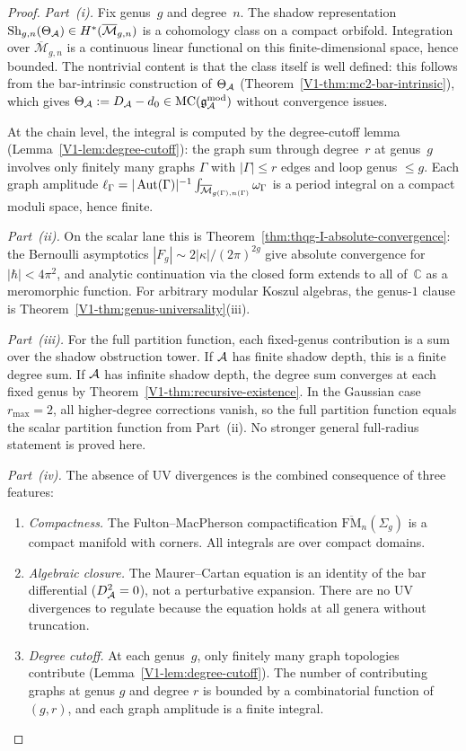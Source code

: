 \begin{proof}
\emph{Part~(i).} Fix genus~$g$ and degree~$n$. The shadow representation $\operatorname{Sh}_{g,n}(\Theta_{\mathcal{A}}) \in H^*(\overline{\mathcal{M}}_{g,n})$ is a cohomology class on a compact orbifold. Integration over $\overline{\mathcal{M}}_{g,n}$ is a continuous linear functional on this finite-dimensional space, hence bounded. The nontrivial content is that the class itself is well defined: this follows from the bar-intrinsic construction of $\Theta_{\mathcal{A}}$ (Theorem~\ref*{V1-thm:mc2-bar-intrinsic}), which gives $\Theta_{\mathcal{A}} := D_{\mathcal{A}} - d_0 \in \mathrm{MC}(\mathfrak{g}_{\mathcal{A}}^{\mathrm{mod}})$ without convergence issues.

At the chain level, the integral is computed by the degree-cutoff lemma (Lemma~\ref{V1-lem:degree-cutoff}): the graph sum through degree~$r$ at genus~$g$ involves only finitely many graphs $\Gamma$ with $|\Gamma| \leq r$ edges and loop genus $\leq g$. Each graph amplitude $\ell_\Gamma = |\operatorname{Aut}(\Gamma)|^{-1} \int_{\overline{\mathcal{M}}_{g(\Gamma),n(\Gamma)}} \omega_\Gamma$ is a period integral on a compact moduli space, hence finite.

\emph{Part~(ii).} On the scalar lane this is
Theorem~\ref{thm:thqg-I-absolute-convergence}: the Bernoulli
asymptotics $|F_g| \sim 2|\kappa|/(2\pi)^{2g}$ give absolute
convergence for $|\hbar| < 4\pi^2$, and analytic continuation via the
closed form extends to all of~$\mathbb{C}$ as a meromorphic function.
For arbitrary modular Koszul algebras, the genus-$1$ clause is
Theorem~\ref{V1-thm:genus-universality}\textup{(iii)}.

\emph{Part~(iii).} For the full partition function, each fixed-genus
contribution is a sum over the shadow obstruction tower. If $\mathcal{A}$ has finite
shadow depth, this is a finite degree sum. If $\mathcal{A}$ has infinite
shadow depth, the degree sum converges at each fixed genus by
Theorem~\ref{V1-thm:recursive-existence}. In the Gaussian case
$r_{\max}=2$, all higher-degree corrections vanish, so the full
partition function equals the scalar partition function from
Part~(ii). No stronger general full-radius statement is proved here.

\emph{Part~(iv).} The absence of UV divergences is the combined consequence of three features:
\begin{enumerate}[label=\textup{(\alph*)}]
\item \emph{Compactness.} The Fulton--MacPherson compactification $\overline{\mathrm{FM}}_n(\Sigma_g)$ is a compact manifold with corners. All integrals are over compact domains.
\item \emph{Algebraic closure.} The Maurer--Cartan equation is an identity of the bar differential ($D_{\mathcal{A}}^2 = 0$), not a perturbative expansion. There are no UV divergences to regulate because the equation holds at all genera without truncation.
\item \emph{Degree cutoff.} At each genus~$g$, only finitely many graph topologies contribute (Lemma~\ref{V1-lem:degree-cutoff}). The number of contributing graphs at genus $g$ and degree $r$ is bounded by a combinatorial function of $(g,r)$, and each graph amplitude is a finite integral.
\end{enumerate}
\end{proof}

